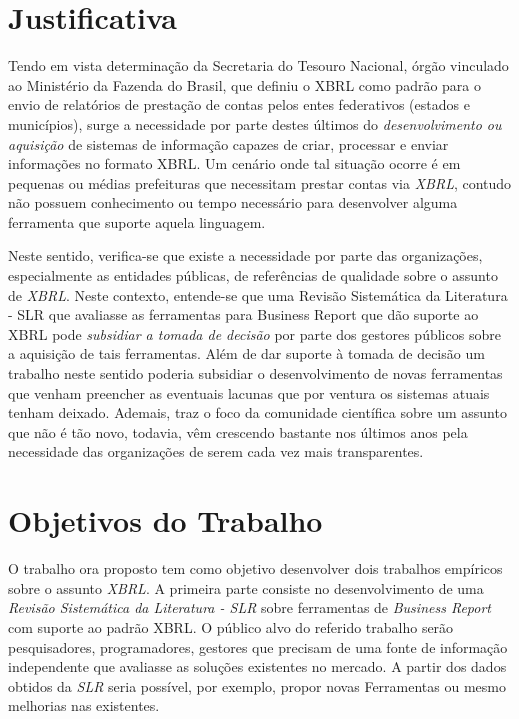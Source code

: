\documentclass{article}
\begin{document}
\section{Justificativa}
\label{sec:contexto}

Tendo em vista determinação da Secretaria do Tesouro Nacional, órgão
vinculado ao  Ministério da Fazenda do Brasil, que definiu o XBRL como
padrão para o envio de relatórios de prestação de contas pelos entes
federativos (estados e municípios), surge a necessidade por parte
destes últimos do \textit{desenvolvimento ou aquisição} de sistemas de
informação capazes de criar, processar e enviar informações no formato
XBRL. Um cenário onde tal situação ocorre é em pequenas ou médias
prefeituras que necessitam prestar contas via \textit{XBRL}, contudo
não possuem conhecimento ou tempo necessário para desenvolver alguma
ferramenta que suporte aquela linguagem.

Neste sentido,  verifica-se que existe a necessidade por parte das
organizações, especialmente as entidades públicas, de referências de
qualidade sobre o assunto de \textit{XBRL}. Neste contexto, entende-se que uma Revisão Sistemática da
  Literatura - SLR  que avaliasse as ferramentas para Business Report que dão suporte ao
XBRL pode \textit{subsidiar a tomada de decisão} por parte dos gestores
públicos sobre a aquisição de tais ferramentas. Além de dar suporte à
tomada de decisão um trabalho neste sentido poderia subsidiar o
desenvolvimento de novas ferramentas que venham preencher as eventuais
lacunas que por ventura os sistemas atuais tenham deixado. Ademais,
traz o foco da comunidade científica sobre um assunto que não é tão
novo, todavia, vêm crescendo bastante nos últimos anos pela
necessidade das organizações de serem cada vez mais transparentes. 

\section{Objetivos do Trabalho}
\label{sec:objetivos}

O trabalho ora proposto tem como objetivo desenvolver dois trabalhos
empíricos sobre o assunto \textit{XBRL}. A primeira parte consiste no
desenvolvimento de uma \textit{Revisão Sistemática da Literatura -
  SLR} sobre ferramentas de \textit{Business Report} com suporte ao
padrão XBRL. O público alvo do referido trabalho serão pesquisadores,
programadores, gestores que precisam de uma fonte de informação
independente que avaliasse as soluções existentes no mercado. A partir
dos dados obtidos da \textit{SLR} seria possível, por exemplo, propor
novas Ferramentas ou mesmo melhorias nas existentes.
\end{document}
